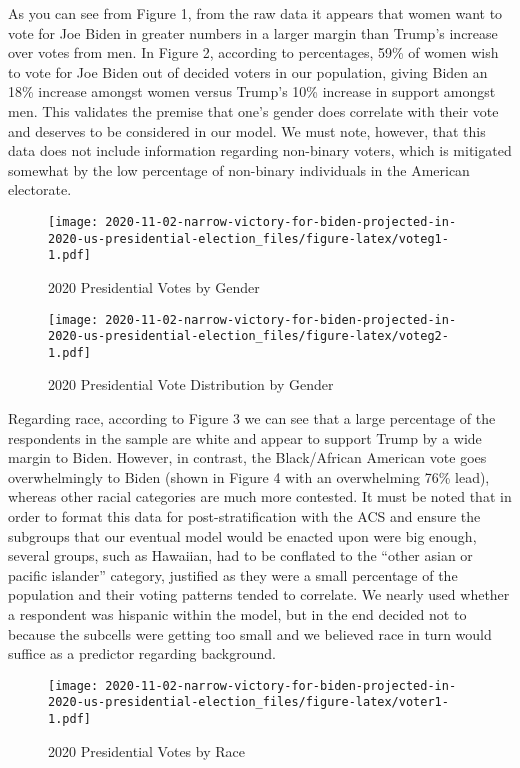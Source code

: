 \documentclass[
]{article}
\begin{document}
As you can see from Figure 1, from the raw data it appears that women want to vote for Joe Biden in greater numbers in a larger margin than Trump's increase over votes from men. In Figure 2, according to percentages, 59\% of women wish to vote for Joe Biden out of decided voters in our population, giving Biden an 18\% increase amongst women versus Trump's 10\% increase in support amongst men. This validates the premise that one's gender does correlate with their vote and deserves to be considered in our model. We must note, however, that this data does not include information regarding non-binary voters, which is mitigated somewhat by the low percentage of non-binary individuals in the American electorate.

\begin{figure}
\centering
\texttt{[image: 2020-11-02-narrow-victory-for-biden-projected-in-2020-us-presidential-election\_files/figure-latex/voteg1-1.pdf]}
\caption{\label{fig:voteg1}2020 Presidential Votes by Gender}
\end{figure}

\begin{figure}
\centering
\texttt{[image: 2020-11-02-narrow-victory-for-biden-projected-in-2020-us-presidential-election\_files/figure-latex/voteg2-1.pdf]}
\caption{\label{fig:voteg2}2020 Presidential Vote Distribution by Gender}
\end{figure}

Regarding race, according to Figure 3 we can see that a large percentage of the respondents in the sample are white and appear to support Trump by a wide margin to Biden. However, in contrast, the Black/African American vote goes overwhelmingly to Biden (shown in Figure 4 with an overwhelming 76\% lead), whereas other racial categories are much more contested. It must be noted that in order to format this data for post-stratification with the ACS and ensure the subgroups that our eventual model would be enacted upon were big enough, several groups, such as Hawaiian, had to be conflated to the ``other asian or pacific islander'' category, justified as they were a small percentage of the population and their voting patterns tended to correlate. We nearly used whether a respondent was hispanic within the model, but in the end decided not to because the subcells were getting too small and we believed race in turn would suffice as a predictor regarding background.

\begin{figure}
\centering
\texttt{[image: 2020-11-02-narrow-victory-for-biden-projected-in-2020-us-presidential-election\_files/figure-latex/voter1-1.pdf]}
\caption{\label{fig:voter1}2020 Presidential Votes by Race}
\end{figure}
\end{document}
